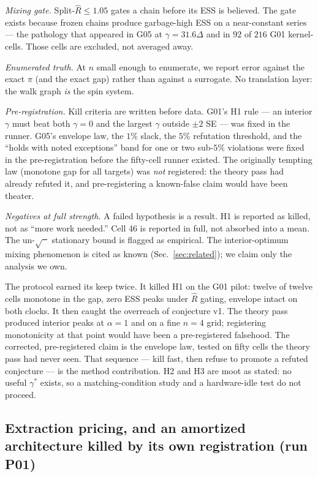 \documentclass[aps,prx,reprint,floatfix,amsmath,amssymb,amsfonts]{revtex4-2}
\begin{document}
\emph{Mixing gate.}
Split-$\hat R\le 1.05$ gates a chain before its ESS is believed. The
gate exists because frozen chains produce garbage-high ESS on a
near-constant series --- the pathology that appeared in G05 at
$\gamma=31.6\Delta$ and in $92$ of $216$ G01 kernel-cells. Those cells
are excluded, not averaged away.

\emph{Enumerated truth.}
At $n$ small enough to enumerate, we report error against the exact
$\pi$ (and the exact gap) rather than against a surrogate. No
translation layer: the walk graph \emph{is} the spin system.

\emph{Pre-registration.}
Kill criteria are written before data. G01's H1 rule --- an interior
$\gamma$ must beat both $\gamma=0$ and the largest $\gamma$ outside
$\pm 2$ SE --- was fixed in the runner. G05's envelope law, the $1\%$
slack, the $5\%$ refutation threshold, and the ``holds with noted
exceptions'' band for one or two sub-$5\%$ violations were fixed in the
pre-registration before the fifty-cell runner existed. The originally
tempting law (monotone gap for all targets) was \emph{not} registered:
the theory pass had already refuted it, and pre-registering a
known-false claim would have been theater.

\emph{Negatives at full strength.}
A failed hypothesis is a result. H1 is reported as killed, not as ``more
work needed.'' Cell 46 is reported in full, not absorbed into a mean.
The un-$\sqrt{\phantom{x}}$ stationary bound is flagged as empirical.
The interior-optimum mixing phenomenon is cited as known
(Sec.~\ref{sec:related}); we claim only the analysis we own.

The protocol earned its keep twice. It killed H1 on the G01 pilot:
twelve of twelve cells monotone in the gap, zero ESS peaks under
$\hat R$ gating, envelope intact on both clocks. It then caught the
overreach of conjecture v1. The theory pass produced interior peaks at
$\alpha=1$ and on a fine $n=4$ grid; registering monotonicity at that
point would have been a pre-registered falsehood. The corrected,
pre-registered claim is the envelope law, tested on fifty cells the
theory pass had never seen. That sequence --- kill fast, then refuse to
promote a refuted conjecture --- is the method contribution. H2 and H3
are moot as stated: no useful $\gamma^\ast$ exists, so a
matching-condition study and a hardware-idle test do not proceed.

\subsection{Extraction pricing, and an amortized architecture killed by
its own registration (run P01)}
\label{sec:extraction}
\end{document}
